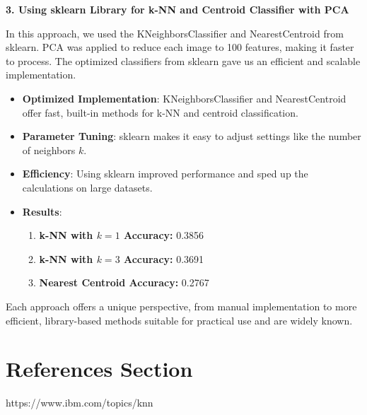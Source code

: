 \documentclass[lettersize,journal]{IEEEtran}
\begin{document}
\vspace{0.3cm}

\textbf{3. Using sklearn Library for k-NN and Centroid Classifier with PCA}

In this approach, we used the KNeighborsClassifier and NearestCentroid from sklearn. PCA was applied to reduce each image to 100 features, making it faster to process. The optimized classifiers from sklearn gave us an efficient and scalable implementation.

\begin{itemize}
    \item \textbf{Optimized Implementation}: KNeighborsClassifier and NearestCentroid offer fast, built-in methods for k-NN and centroid classification.
    \item \textbf{Parameter Tuning}: sklearn makes it easy to adjust settings like the number of neighbors \( k \).
    \item \textbf{Efficiency}: Using sklearn improved performance and sped up the calculations on large datasets.
    \item \textbf{Results}:
    \begin{enumerate}
        \item \textbf{k-NN with \( k = 1 \) Accuracy:} 0.3856
        \item \textbf{k-NN with \( k = 3 \) Accuracy:} 0.3691
        \item \textbf{Nearest Centroid Accuracy:} 0.2767
    \end{enumerate}
\end{itemize}

Each approach offers a unique perspective, from manual implementation to more efficient, library-based methods suitable for practical use and are widely known.

\section{References Section}
\begin{thebibliography}{1}

https://www.ibm.com/topics/knn
\end{thebibliography}
\end{document}
